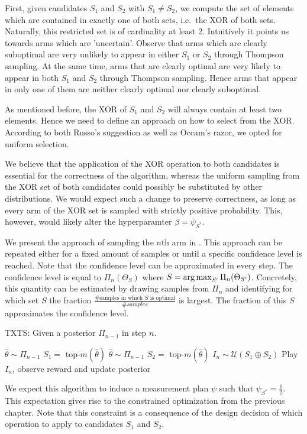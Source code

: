 First, given candidates $S_1$ and $S_2$ with $S_1 \neq S_2$, we compute the set
of elements which are contained in exactly one of both sets, i.e.\ the XOR of
both sets. Naturally, this restricted set is of cardinality at least 2.
Intuitively it points us towards arms which are 'uncertain'. Observe that arms
which are clearly suboptimal are very unlikely to appear in either $S_1$ or
$S_2$ through Thompson sampling. At the same time, arms that are clearly optimal
are very likely to appear in both $S_1$ and $S_2$ through Thompson sampling.
Hence arms that appear in only one of them are neither clearly optimal nor
clearly suboptimal.

As mentioned before, the XOR of $S_1$ and $S_2$ will always contain at least two
elements. Hence we need to define an approach on how to select from the XOR.
According to both Russo's suggestion as well as Occam's razor, we opted for
uniform selection.

We believe that the application of the XOR operation to both candidates is
essential for the correctness of the algorithm, whereas the uniform sampling
from the XOR set of both candidates could possibly be substituted by other
distributions. We would expect such a change to preserve correctness, as long as
every arm of the XOR set is sampled with strictly positive probability. This,
however, would likely alter the hyperparamter $\beta = \psi_{S^*}$.

We present the approach of sampling the $n$th arm in .
This approach can be repeated either for a fixed amount of samples or until a
specific confidence level is reached. Note that the confidence level can be
approximated in every step. The confidence level is equal to $\Pi_n(\Theta_S)$
where $S = \operatorname*{arg\,max}_{S'} \Pi_n(\Theta_{S'})$. Concretely, this quantity can be
estimated by drawing samples from $\Pi_n$ and identifying for which set $S$ the
fraction $\frac{\text{\# samples in which $S$ is optimal}}{\#samples}$ is
largest. The fraction of this $S$ approximates the confidence level.
\begin{algorithm}[H]
  \caption{TXTS: Given a posterior $\Pi_{n-1}$ in step $n$.}
  \label{alg:TXTS}
  \begin{algorithmic}
    \State $\hat{\theta} \sim \Pi_{n-1}$
    \State $S_1 =$ top-$m(\hat{\theta})$
    \Repeat
      \State $\hat{\theta} \sim \Pi_{n-1}$
      \State $S_2 = $ top-$m(\hat{\theta})$
    \State $I_n \sim \mathcal{U}(S_1 \oplus S_2)$
    \State Play $I_n$, observe reward and update posterior
  \end{algorithmic}
\end{algorithm}
We expect this algorithm to induce a measurement plan $\psi$ such that
$\psi_{S^*} = \frac{1}{2}$. This expectation gives rise to the constrained
optimization from the previous chapter. Note that this constraint is a
consequence of the design decision of which operation to apply to candidates
$S_1$ and $S_2$.

